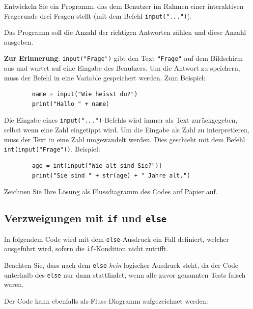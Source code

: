 \begin{myexercise}
	Entwickeln Sie ein Programm, das dem Benutzer im Rahmen einer interaktiven Fragerunde drei Fragen stellt (mit dem Befehl \lstinline|input("...")|).

	Das Programm soll die Anzahl der richtigen Antworten
	zählen und diese Anzahl ausgeben.

	\textbf{Zur Erinnerung}: \lstinline|input("Frage")| gibt den Text \lstinline|"Frage"| auf dem Bildschirm aus und wartet auf eine Eingabe des Benutzers. Um die Antwort zu speichern, muss der Befehl in eine Variable gespeichert werden. Zum Beispiel:

	\begin{lstlisting}
		name = input("Wie heisst du?")
		print("Hallo " + name)
	\end{lstlisting}

	Die Eingabe eines \lstinline|input("...")|-Befehls wird immer als Text zurückgegeben, selbst wenn eine Zahl eingetippt wird. Um die Eingabe als Zahl zu interpretieren, muss der Text in eine Zahl umgewandelt werden. Dies geschieht mit dem Befehl \lstinline|int(input("Frage"))|. Beispiel:

	\begin{lstlisting}
		age = int(input("Wie alt sind Sie?"))
		print("Sie sind " + str(age) + " Jahre alt.")
	\end{lstlisting}

	Zeichnen Sie Ihre Lösung als Flussdiagramm des Codes auf Papier auf.
	\begin{myanswer}
		
	\end{myanswer}
\end{myexercise}


\subsection{Verzweigungen mit \texorpdfstring{\lstinline|if|}{if} und \texorpdfstring{\lstinline|else|}{else}}

\begin{myexample}
In folgendem Code wird mit dem \lstinline|else|-Ausdruck ein Fall definiert, welcher ausgeführt wird, sofern die \lstinline|if|-Kondition nicht zutrifft.


Beachten Sie, dass nach dem \lstinline|else| \textit{kein} logischer Ausdruck steht, da der Code unterhalb des \lstinline|else| nur dann stattfindet, wenn alle zuvor genannten Tests falsch waren.

Der Code kann ebenfalls als Fluss-Diagramm aufgezeichnet werden:
\begin{figure}[H]
	\centering
	
\end{figure}
\end{myexample}

